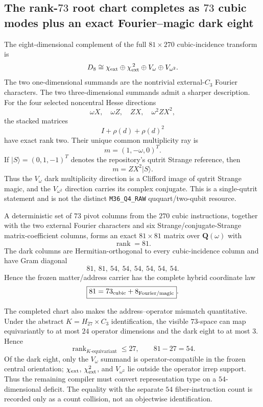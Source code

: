 \subsection*{The rank-$73$ root chart completes as $73$ cubic modes plus an exact Fourier--magic dark eight}

The eight-dimensional complement of the full $81\times270$ cubic-incidence
transform is
\[
D_8\cong
\chi_{\rm ext}\oplus\chi_{\rm ext}^{\,2}
\oplus V_\omega\oplus V_{\omega^2}.
\]
The two one-dimensional summands are the nontrivial external-$C_3$ Fourier
characters.  The two three-dimensional summands admit a sharper description.
For the four selected noncentral Hesse directions
\[
\omega X,\quad \omega Z,\quad ZX,\quad \omega^2ZX^2,
\]
the stacked matrices
\[
I+\rho(d)+\rho(d)^2
\]
have exact rank two.  Their unique common multiplicity ray is
\[
\boxed{m=(1,-\omega,0)^T}.
\]
If $|S\rangle=(0,1,-1)^T$ denotes the repository's qutrit Strange reference,
then
\[
\boxed{m=ZX^2|S\rangle}.
\]
Thus the $V_\omega$ dark multiplicity direction is a Clifford image of qutrit
Strange magic, and the $V_{\omega^2}$ direction carries its complex conjugate.
This is a single-qutrit statement and is not the distinct
\texttt{M36\_Q4\_RAW} ququart/two-qubit resource.

A deterministic set of $73$ pivot columns from the $270$ cubic instructions,
together with the two external Fourier characters and six
Strange/conjugate-Strange matrix-coefficient columns, forms an exact
$81\times81$ matrix over $\mathbf Q(\omega)$ with
\[
\boxed{\operatorname{rank}=81}.
\]
The dark columns are Hermitian-orthogonal to every cubic-incidence column and
have Gram diagonal
\[
81,\ 81,\ 54,\ 54,\ 54,\ 54,\ 54,\ 54.
\]
Hence the frozen matter/address carrier has the complete hybrid coordinate law
\[
\boxed{81=73_{\rm cubic}+8_{\rm Fourier/magic}}.
\]


The completed chart also makes the address--operator mismatch quantitative.
Under the abstract \(K=H_{27}\times C_3\) identification, the visible
\(73\)-space can map equivariantly to at most \(24\) operator dimensions and
the dark eight to at most \(3\).  Hence
\[
\boxed{\operatorname{rank}_{K\text{-equivariant}}\le27,\qquad
81-27=54.}
\]
Of the dark eight, only the \(V_\omega\) summand is operator-compatible in the
frozen central orientation; \(\chi_{\rm ext}\), \(\chi_{\rm ext}^2\), and
\(V_{\omega^2}\) lie outside the operator irrep support.  Thus the remaining
compiler must convert representation type on a \(54\)-dimensional deficit.
The equality with the separate \(54\) fiber-instruction count is recorded only
as a count collision, not an objectwise identification.

